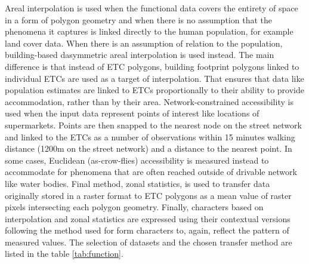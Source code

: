Areal interpolation is used when the functional data covers the entirety of space in a
form of polygon geometry and when there is no assumption that the phenomena it captures
is linked directly to the human population, for example land cover data. When there is
an assumption of relation to the population, building-based dasymmetric areal
interpolation is used instead. The main difference is that instead of ETC polygons,
building footprint polygons linked to individual ETCs are used as a target of
interpolation. That ensures that data like population estimates are linked to ETCs
proportionally to their ability to provide accommodation, rather than by their area.
Network-constrained accessibility is used when the input data represent points of
interest like locations of supermarkets. Points are then snapped to the nearest node on
the street network and linked to the ETCs as a number of observations within 15 minutes
walking distance (1200m on the street network) and a distance to the nearest point. In
some cases, Euclidean (as-crow-flies) accessibility is measured instead to accommodate
for phenomena that are often reached outside of drivable network like water bodies.
Final method, zonal statistics, is used to transfer data originally stored in a raster
format to ETC polygons as a mean value of raster pixels intersecting each polygon
geometry. Finally, characters based on interpolation and zonal statistics are expressed
using their contextual versions following the method used for form characters to, again,
reflect the pattern of measured values. The selection of datasets and the chosen
transfer method are listed in the table \ref{tab:function}.

